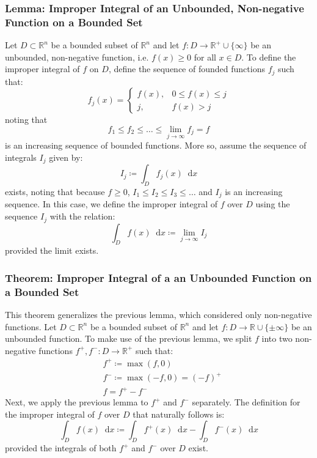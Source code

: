 \documentclass[11pt, a4paper]{article}
\newcommand{\diff}{\mathop{}\!\mathrm{d}} %
\begin{document}
\subsubsection{Lemma: Improper Integral of an Unbounded, Non-negative Function on a Bounded Set}
Let $ D \subset \mathbb{R}^n $ be a bounded subset of $ \mathbb{R}^{n} $ and let $ f : D \rightarrow \mathbb{R}^{+} \cup \{\infty\} $ be an unbounded, non-negative function, i.e. $ f(x) \geq 0 $ for all $ x \in D $. To define the improper integral of $ f $ on $ D $, define the sequence of founded functions $ f_j $ such that:
\[ f_j(x) = 
	\begin{cases}
		f(x), & 0 \leq f(x) \leq j \\
		j, & f(x) > j
	\end{cases}
\]
noting that 
\begin{equation*}
	f_1 \leq f_2 \leq \dots \leq \lim_{j \rightarrow \infty} f_j = f
\end{equation*}
is an increasing sequence of bounded functions. More so, assume the sequence of integrals $ I_j $ given by:
\begin{equation*}
	I_j \coloneqq \int_{D} f_j(x) \diff x
\end{equation*} 
exists, noting that because $ f \geq 0 $, $ I_1 \leq I_2 \leq I_3 \leq \dots $ and $ I_j $ is an increasing sequence. In this case, we define the improper integral of $ f $ over $ D $ using the sequence $ I_j $ with the relation:
\begin{equation*}
\int_D f(x) \diff x \coloneqq \lim_{j \rightarrow \infty} I_j
\end{equation*}
provided the limit exists.
	
\subsubsection{Theorem: Improper Integral of a an Unbounded Function on a Bounded Set}
This theorem generalizes the previous lemma, which considered only non-negative functions. 
Let $ D \subset \mathbb{R}^n $ be a bounded subset of $ \mathbb{R}^{n} $ and let $ f : D \rightarrow \mathbb{R} \cup \{\pm \infty\} $ be an unbounded function. To make use of the previous lemma, we split $ f $ into two non-negative functions $ f^{+}, f^{-}: D \rightarrow \mathbb{R}^{+}$ such that:
\begin{align*}
&f^{+} \coloneqq \max(f, 0)\\
&f^{-} \coloneqq \max(-f, 0) = (-f)^+\\
&f = f^+ - f^-
\end{align*}
Next, we apply the previous lemma to $ f^+ $ and $ f^- $ separately. The definition for the improper integral of $ f $ over $ D $ that naturally follows is:
\begin{equation*}
\int_D f(x) \diff x \coloneqq \int_D f^+(x) \diff x - \int_D f^-(x) \diff x
\end{equation*}
provided the integrals of both $ f^+ $ and $ f^- $ over $ D $ exist.
	
\end{document}
